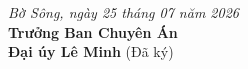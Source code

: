 \documentclass[12pt,a4paper]{article}
\begin{document}
\vspace{1cm}

\begin{flushright}
    \textit{Bờ Sông, ngày 25 tháng 07 năm 2026}\\
    \textbf{Trưởng Ban Chuyên Án}\\
    \vspace{1.5cm}
    \textbf{Đại úy Lê Minh} (Đã ký)
\end{flushright}
\end{document}
